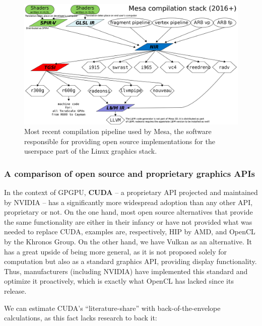 \documentclass[11pt, conference, onecolumn, final]{IEEEtran}
\begin{document}
\begin{figure}[H]
    \centering
    \includegraphics[width=0.8\linewidth]{mesa.png}
    \caption{Most recent compilation pipeline used by Mesa, the software
        responsible for providing open source implementations for the userspace
        part of the Linux graphics stack.}
    \label{fig:mesa-cs}
    \end{figure}

\subsubsection{A comparison of open source and proprietary graphics APIs} \label{sec:proposal:gapis-comparison}


In the context of GPGPU, \textbf{CUDA} -- a proprietary API
projected and maintained by NVIDIA -- has a significantly more widespread
adoption than any other API, proprietary or not.
On the one hand, most open source alternatives that provide the same
functionality are either in their infancy or have not provided what was needed
to replace CUDA, examples are, respectively, HIP by AMD, and OpenCL by the
Khronos Group.
On the other hand, we have Vulkan as an alternative.
It has a great upside of being more general, as it is not proposed solely for
computation but also as a standard graphics API, providing display
functionality.
Thus, manufacturers (including NVIDIA) have implemented this standard and
optimize it proactively, which is exactly what OpenCL has lacked since its
release.


We can estimate CUDA's ``literature-share'' with back-of-the-envelope
calculations, as this fact lacks research to back it:
\end{document}

